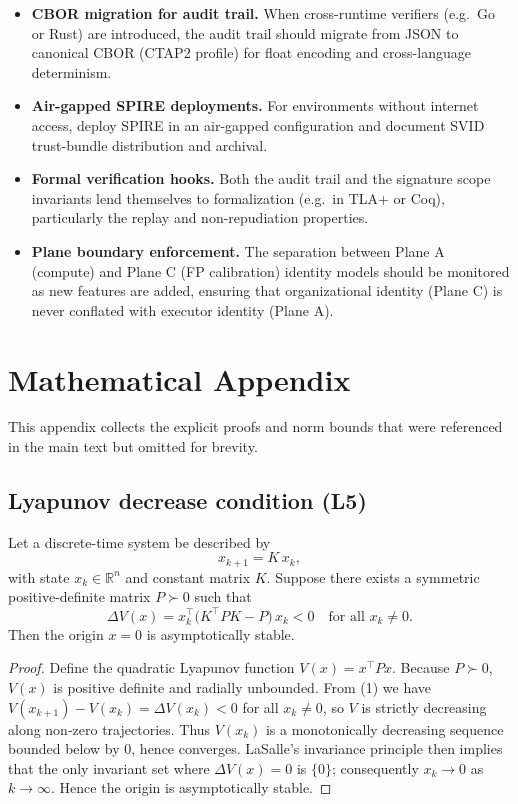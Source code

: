 \documentclass[11pt]{article}
\begin{document}
\begin{itemize}
  \item \textbf{CBOR migration for audit trail.} When cross-runtime
        verifiers (e.g.\ Go or Rust) are introduced, the audit trail
        should migrate from JSON to canonical CBOR (CTAP2 profile) for
        float encoding and cross-language determinism.

  \item \textbf{Air-gapped SPIRE deployments.} For environments without
        internet access, deploy SPIRE in an air-gapped configuration
        and document SVID trust-bundle distribution and archival.

  \item \textbf{Formal verification hooks.} Both the audit trail and
        the signature scope invariants lend themselves to formalization
        (e.g.\ in TLA+ or Coq), particularly the replay and
        non-repudiation properties.

  \item \textbf{Plane boundary enforcement.} The separation between
        Plane A (compute) and Plane C (FP calibration) identity models
        should be monitored as new features are added, ensuring that
        organizational identity (Plane C) is never conflated with
        executor identity (Plane A).
\end{itemize}

\appendix
\section{Mathematical Appendix}
\label{app:math}

This appendix collects the explicit proofs and norm bounds that were
referenced in the main text but omitted for brevity.

\subsection{Lyapunov decrease condition (L5)}
\begin{theorem}\label{thm:lyap}
Let a discrete-time system be described by
\[
  x_{k+1}=K\,x_k,
\]
with state $x_k\in\mathbb{R}^n$ and constant matrix $K$.
Suppose there exists a symmetric positive-definite matrix $P\succ0$
such that
\[
  \Delta V(x)=x_k^\top\!\bigl(K^\top P K-P\bigr)\,x_k<0
\quad\text{for all }x_k\neq0.
\tag{1}
\]
Then the origin $x=0$ is asymptotically stable.
\end{theorem}
\begin{proof}
Define the quadratic Lyapunov function $V(x)=x^\top P x$.
Because $P\succ0$, $V(x)$ is positive definite and radially unbounded.
From (1) we have $V(x_{k+1})-V(x_k)=\Delta V(x_k)<0$ for all $x_k\neq0$,
so $V$ is strictly decreasing along non‑zero trajectories.
Thus $V(x_k)$ is a monotonically decreasing sequence bounded below by
$0$, hence converges.  LaSalle’s invariance principle then implies that
the only invariant set where $\Delta V(x)=0$ is $\{0\}$; consequently
$x_k\to0$ as $k\to\infty$.  Hence the origin is asymptotically stable.
\end{proof}
\end{document}
